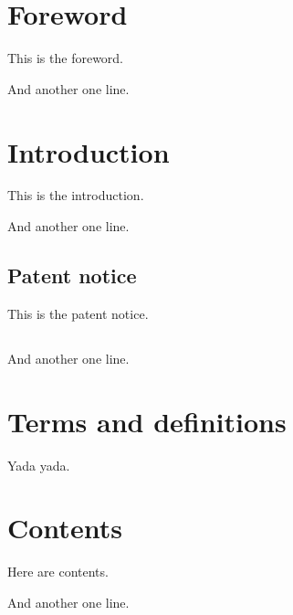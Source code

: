 \documentclass{IsoStandardDocument}
\begin{document}
  \section*{Foreword}

  This is the foreword.

  And another one line.

  \section*{Introduction}

  This is the introduction.

  And another one line.

  \subsection*{Patent notice}

  This is the patent notice.

  \subsection*{}

  And another one line.

  \section{Terms and definitions}

  Yada yada.

  \section{Contents}

  Here are contents.

  And another one line.
\end{document}
